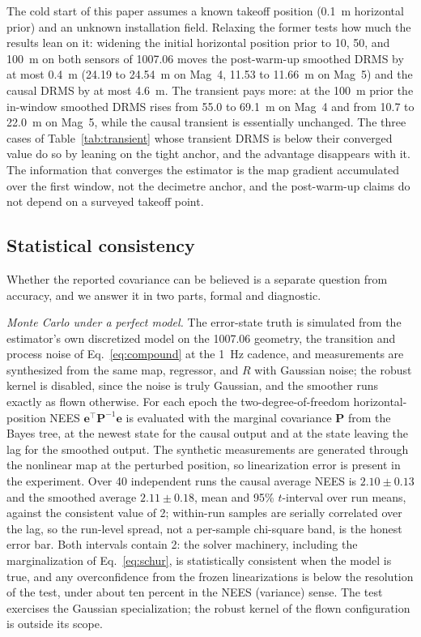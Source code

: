 \documentclass{IEEEtaes}
\begin{document}
The cold start of this paper assumes a known takeoff position
(\SI{0.1}{\meter} horizontal prior) and an unknown installation field.
Relaxing the former tests how much the results lean on it: widening the
initial horizontal position prior to \SI{10}{}, \SI{50}{}, and
\SI{100}{\meter} on both sensors of 1007.06 moves the post-warm-up smoothed
DRMS by at most \SI{0.4}{\meter} (\SI{24.19}{} to \SI{24.54}{\meter} on
Mag~4, \SI{11.53}{} to \SI{11.66}{\meter} on Mag~5) and the causal DRMS by
at most \SI{4.6}{\meter}. The transient pays more: at the \SI{100}{\meter}
prior the in-window smoothed DRMS rises from \SI{55.0}{} to
\SI{69.1}{\meter} on Mag~4 and from \SI{10.7}{} to \SI{22.0}{\meter} on
Mag~5, while the causal transient is essentially unchanged. The three cases of
Table~\ref{tab:transient} whose transient DRMS is below their converged value
do so by leaning on the tight anchor, and the advantage disappears with it. The information
that converges the estimator is the map gradient accumulated over the first
window, not the decimetre anchor, and the post-warm-up claims do not depend
on a surveyed takeoff point.

\subsection{Statistical consistency}\label{sec:consistency}
Whether the reported covariance can be believed is a separate question from
accuracy, and we answer it in two parts, formal and diagnostic.

\emph{Monte Carlo under a perfect model.} The error-state truth is simulated
from the estimator's own discretized model on the 1007.06 geometry, the
transition and process noise of Eq.~\eqref{eq:compound} at the \SI{1}{\hertz}
cadence, and measurements are synthesized from the same map, regressor, and
$R$ with Gaussian noise; the robust kernel is disabled, since the noise is
truly Gaussian, and the smoother runs exactly as flown otherwise. For each
epoch the two-degree-of-freedom horizontal-position NEES
$\mathbf{e}^{\top}\mathbf{P}^{-1}\mathbf{e}$ is evaluated with the marginal
covariance $\mathbf{P}$ from the Bayes tree, at the newest state for the
causal output and at the state leaving the lag for the smoothed output. The
synthetic measurements are generated through the nonlinear map at the
perturbed position, so linearization error is present in the experiment.
Over \num{40} independent runs the causal average NEES is $2.10\pm0.13$ and
the smoothed average $2.11\pm0.18$, mean and 95\% $t$-interval over run
means, against the consistent value of \num{2}; within-run samples are
serially correlated over the lag, so the run-level spread, not a per-sample
chi-square band, is the honest error bar. Both intervals contain \num{2}:
the solver machinery, including the marginalization of
Eq.~\eqref{eq:schur}, is statistically consistent when the model is true,
and any overconfidence from the frozen linearizations is below the
resolution of the test, under about ten percent in the NEES (variance)
sense. The test exercises the Gaussian specialization; the robust kernel of
the flown configuration is outside its scope.
\end{document}
